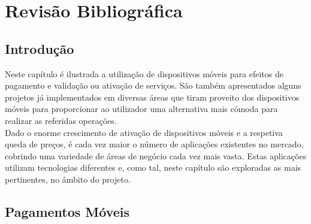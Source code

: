 \chapter{Revisão Bibliográfica} \label{chap:sota}

\section*{}

%

\section{Introdução}

Neste capítulo é ilustrada a utilização de dispositivos móveis para efeitos de pagamento e validação ou ativação de serviços. São também apresentados alguns projetos já implementados em diversas áreas que tiram proveito dos dispositivos móveis para proporcionar ao utilizador uma alternativa mais cómoda para realizar as referidas operações.
\\Dado o enorme crescimento de ativação de dispositivos móveis e a respetiva queda de preços, é cada vez maior o número de aplicações existentes no mercado, cobrindo uma variedade de áreas de negócio cada vez mais vasta. Estas aplicações utilizam tecnologias diferentes e, como tal, neste capítulo são exploradas as mais pertinentes, no âmbito do projeto.

\section{Pagamentos Móveis}\label{sec:pagmov}

